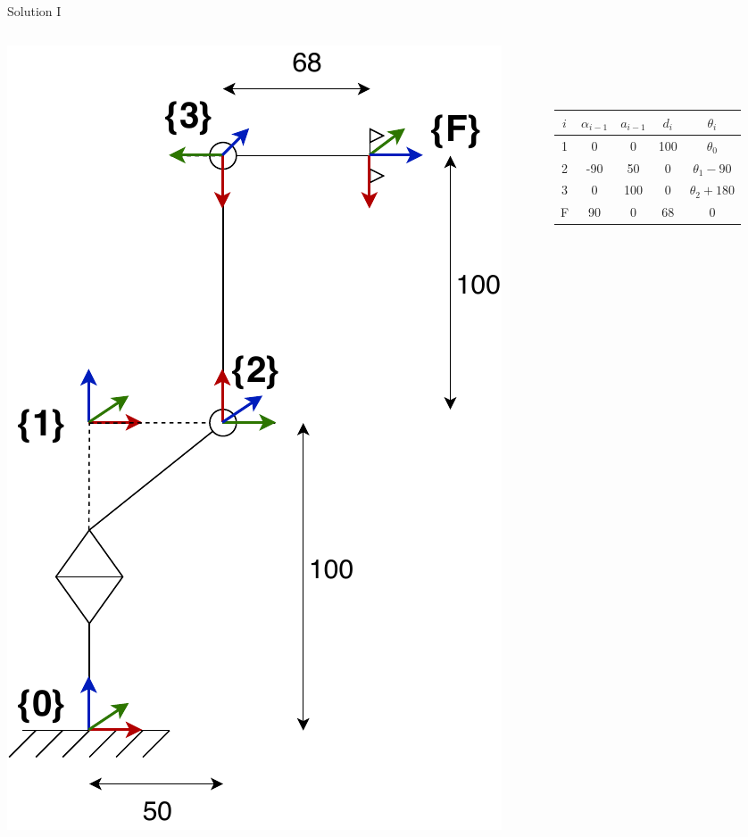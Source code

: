 \documentclass{beamer}
\begin{document}
\begin{frame}{Solution I}

\begin{columns}[T] %
	\begin{column}{.48\textwidth}
		\begin{center}
			\includegraphics[width=\textwidth,height=0.8\textheight,keepaspectratio]{images/robot_axis_coord.pdf}
		\end{center}
		
	\end{column}%
	\hfill%
	\begin{column}{.45\textwidth}
		~\\~\\~\\
		\begin{center}
			\begin{tabular}{ c c c c c }
				$i$ & $\alpha_{i-1}$ & $a_{i-1}$ & $d_i$ & $\theta_i$\\ 
				\hline
				1 & 0 & 0 & 100 & $\theta_0$\\  
				2 & -90 & 50 & 0 & $\theta_1 - 90$\\ 
				3 & 0 & 100 & 0 & $\theta_2 + 180$\\ 
				F & 90 & 0 & 68 & $0$
			\end{tabular}
		\end{center}


\end{column}
\end{columns}
\end{frame}
\end{document}

